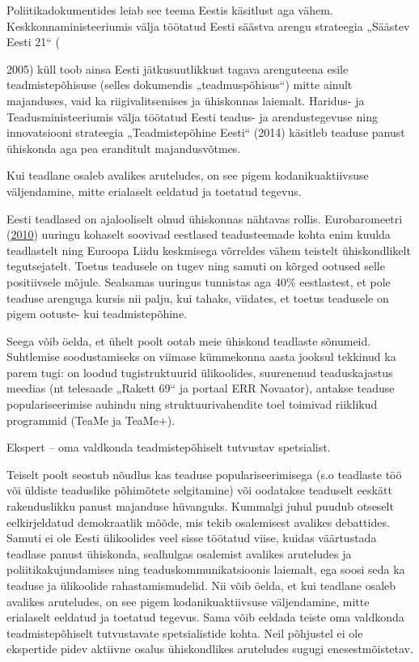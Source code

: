 \documentclass[estonian,]{article}
\begin{document}
Poliitikadokumentides leiab see teema Eestis käsitlust aga vähem. Keskkonnaministeeriumis välja töötatud Eesti säästva arengu strateegia „Säästev Eesti 21`` (

2005) küll toob ainsa Eesti jätkusuutlikkust tagava arenguteena esile teadmistepõhisuse (selles dokumendis „teadmuspõhisus``) mitte ainult majanduses, vaid ka riigivalitsemises ja ühiskonnas laiemalt. Haridus- ja Teadusministeeriumis välja töötatud Eesti teadus- ja arendustegevuse ning innovatsiooni strateegia „Teadmistepõhine Eesti`` (2014) käsitleb teaduse panust ühiskonda aga pea eranditult majandusvõtmes.

\begin{blockquote-left}
Kui teadlane osaleb avalikes aruteludes, on see pigem kodanikuaktiivsuse
väljendamine, mitte erialaselt eeldatud ja toetatud tegevus.
\end{blockquote-left}

Eesti teadlased on ajalooliselt olnud ühiskonnas nähtavas rollis. Eurobaromeetri (\protect\hyperlink{Eurobarometer2010}{2010}) uuringu kohaselt soovivad eestlased teadusteemade kohta enim kuulda teadlastelt ning Euroopa Liidu keskmisega võrreldes vähem teistelt ühiskondlikelt tegutsejatelt. Toetus teadusele on tugev ning samuti on kõrged ootused selle positiivsele mõjule. Sealsamas uuringus tunnistas aga 40\% eestlastest, et pole teaduse arenguga kursis nii palju, kui tahaks, viidates, et toetus teadusele on pigem ootuste- kui teadmistepõhine.

Seega võib öelda, et ühelt poolt ootab meie ühiskond teadlaste sõnumeid. Suhtlemise soodustamiseks on viimase kümmekonna aasta jooksul tekkinud ka parem tugi: on loodud tugistruktuurid ülikoolides, suurenenud teaduskajastus meedias (nt telesaade „Rakett 69`` ja portaal ERR Novaator), antakse teaduse populariseerimise auhindu ning struktuurivahendite toel toimivad riiklikud programmid (TeaMe ja TeaMe+).

\begin{blockquote-right}
Ekspert -- oma valdkonda teadmistepõhiselt tutvustav spetsialist.
\end{blockquote-right}

Teiselt poolt seostub nõudlus kas teaduse populariseerimisega (s.o teadlaste töö või üldiste teaduslike põhimõtete selgitamine) või oodatakse teaduselt eeskätt rakenduslikku panust majanduse hüvanguks. Kummalgi juhul puudub otseselt eelkirjeldatud demokraatlik mõõde, mis tekib osalemisest avalikes debattides. Samuti ei ole Eesti ülikoolides veel sisse töötatud viise, kuidas väärtustada teadlase panust ühiskonda, sealhulgas osalemist avalikes aruteludes ja poliitikakujundamises ning teaduskommunikatsioonis laiemalt, ega soosi seda ka teaduse ja ülikoolide rahastamismudelid. Nii võib öelda, et kui teadlane osaleb avalikes aruteludes, on see pigem kodanikuaktiivsuse väljendamine, mitte erialaselt eeldatud ja toetatud tegevus. Sama võib eeldada teiste oma valdkonda teadmistepõhiselt tutvustavate spetsialistide kohta. Neil põhjustel ei ole ekspertide pidev aktiivne osalus ühiskondlikes aruteludes sugugi enesestmõistetav.
\end{document}

